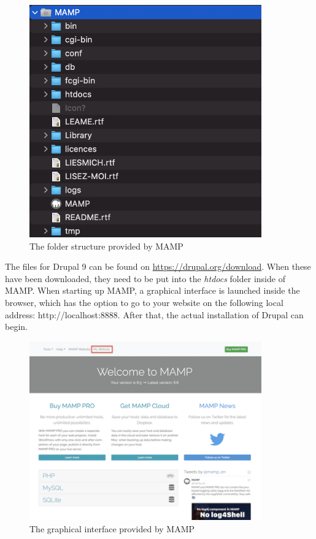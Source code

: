 \begin{figure}
	\centering
	\includegraphics[width=10cm]{./img/MAMP_Structure.png}
	\caption[MAMP folder structure]{The folder structure provided by MAMP}
	\label{fig:MAMP_Structure}
\end{figure}

The files for Drupal 9 can be found on \url{https://drupal.org/download}. When these have been downloaded, they need to be put into the \emph{htdocs} folder inside of MAMP. When starting up MAMP, a graphical interface is launched inside the browser, which has the option to go to your website on the following local address: http://localhost:8888. After that, the actual installation of Drupal can begin.

\begin{figure}
	\centering
	\includegraphics[width=10cm]{./img/MAMP_Web.png}
	\caption[MAMP interface]{The graphical interface provided by MAMP}
	\label{fig:MAMP_Web}
\end{figure}

